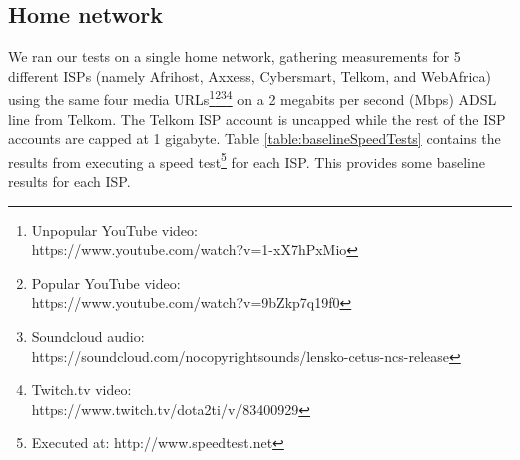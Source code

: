 \documentclass{sig-alternate-05-2015}
\begin{document}
\subsection{Home network}
We ran our tests on a single home network, gathering measurements for 5 different ISPs (namely Afrihost, Axxess, Cybersmart, Telkom, and WebAfrica) using the same four media URLs\footnote{Unpopular YouTube video: \\ https://www.youtube.com/watch?v=1-xX7hPxMio}\footnote{Popular YouTube video: \\ https://www.youtube.com/watch?v=9bZkp7q19f0}\footnote{Soundcloud audio: \\ https://soundcloud.com/nocopyrightsounds/lensko-cetus-ncs-release}\footnote{Twitch.tv video: \\https://www.twitch.tv/dota2ti/v/83400929} on a 2 megabits per second (Mbps) ADSL line from Telkom. The Telkom ISP account is uncapped while the rest of the ISP accounts are capped at 1 gigabyte. Table \ref{table:baselineSpeedTests} contains the results from executing a speed test\footnote{Executed at: http://www.speedtest.net} for each ISP. This provides some baseline results for each ISP.

\begin{table}
	\caption{Baseline speed test for each ISP}
	\label{table:baselineSpeedTests}
\end{table}
\end{document}
